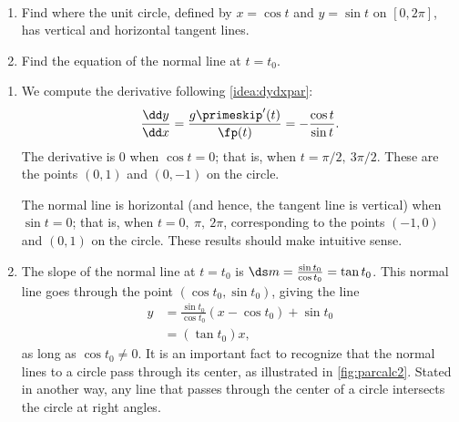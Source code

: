 \begin{example}\label{ex_parcalc2}%
\mbox{}\\[-2\baselineskip]\parbox[t]{\linewidth}{\begin{enumerate}
	\item	Find where the unit circle, defined by $x=\cos t$ and $y=\sin t$ on $[0,2\pi]$, has vertical and horizontal tangent lines. 
	\item	 Find the equation of the normal line at $t=t_0$.
\end{enumerate}}\vspace{0pt}
\solution
\begin{enumerate}
	\item We compute the derivative following \autoref{idea:dydxpar}:
	\[\frac{\dd y}{\dd x} = \frac{g\primeskip'(t)}{\fp(t)} = -\frac{\cos t}{\sin t}.\]
	The derivative is $0$ when $\cos t= 0$; that is, when $t=\pi/2,\ 3\pi/2$. These are the points $(0,1)$ and $(0,-1)$ on the circle.

	The normal line is horizontal (and hence, the tangent line is vertical) when $\sin t=0$; that is, when $t= 0,\ \pi,\ 2\pi$, corresponding to the points $(-1,0)$ and $(0,1)$ on the circle. These results should make intuitive sense.
	\item	The slope of the normal line at $t=t_0$ is $\ds m=\frac{\sin t_0}{\cos t_0} = \tan t_0$. This normal line goes through the point $(\cos t_0,\sin t_0)$, giving the line
%
%
%
\begin{align*}
	y &=\frac{\sin t_0}{\cos t_0}(x-\cos t_0) + \sin t_0\\	
	&= (\tan t_0)x,
\end{align*}
as long as $\cos t_0\neq 0$. It is an important fact to recognize that the normal lines to a circle pass through its center, as illustrated in \autoref{fig:parcalc2}. Stated in another way, any line that passes through the center of a circle intersects the circle at right angles.
\end{enumerate}
\end{example}

